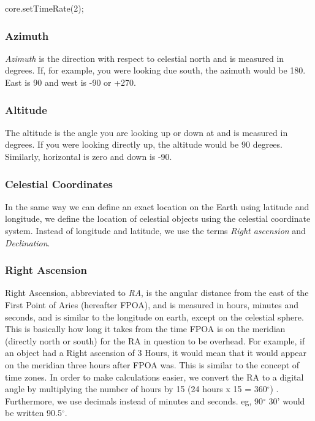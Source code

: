 \begin{syntax}
	core.setTimeRate(2);
\end{syntax}


\subsubsection{Azimuth}
\textit{Azimuth} is the direction with respect to celestial north and is measured in degrees. If, for example, you were looking due south, the azimuth would be 180. East is 90 and west is -90 or +270. 

\subsubsection{Altitude}
The altitude is the angle you are looking up or down at and is measured in degrees. If you were looking directly up, the altitude would be 90 degrees. Similarly, horizontal is zero and down is -90.

\subsubsection{Celestial Coordinates}
In the same way we can define an exact location on the Earth using latitude and longitude, we define the location of celestial objects using the celestial coordinate system. Instead of longitude and latitude, we use the terms \textit{Right ascension} and \textit{Declination}. 

\subsubsection{Right Ascension}
Right Ascension, abbreviated to \textit{RA}, is the angular distance from the east of the First Point of Aries (hereafter FPOA), and is measured in hours, minutes and seconds, and is similar to the longitude on earth, except on the celestial sphere. This is basically how long it takes from the time FPOA is on the meridian (directly north or south) for the RA in question to be overhead. For example, if an object had a Right ascension of 3 Hours, it would mean that it would appear on the meridian three hours after FPOA was.  This is similar to the concept of time zones. In order to make calculations easier, we convert the RA to a digital angle by multiplying the number of hours by 15 (24 hours x 15 = 360$^{\circ}$) . Furthermore, we use decimals instead of minutes and seconds. eg, 90$^{\circ}$ 30' would be written 90.5$^{\circ}$. 

